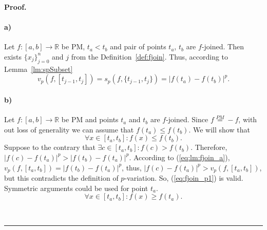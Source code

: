 \documentclass[12pt, a4paper]{article}
\newenvironment{proof}[1][Proof]{\noindent \textbf{#1.} }{\  \rule{0.5em}{0.5em}}
\numberwithin{equation}{section}
\begin{document}
\begin{proof}
  \paragraph*{a)}
  Let $f:[a,b] \rightarrow \mathbb{R}$  be PM, 
  $t_a<t_b$ and pair of points $t_a$, $t_b$ are $f$-joined. 
  Then exists $\{x_j\}_{j=0}^{n}$ and $j$ from the
  Definition~\ref{def:fjoin}.
  Thus, according to Lemma~\ref{lm:spSubset}
  \begin{equation}\label{eq:lm:fjoin_a}
    v_p(f,[t_{j-1}, t_j]) = 
      s_p\left(f,\{t_{j-1}, t_j\}\right) = \left|f(t_a)-f(t_b)\right|^p.
  \end{equation}      
  
  \paragraph*{b)}
  Let $f:[a,b] \rightarrow \mathbb{R}$ be PM 
  and points $t_a$ and $t_b$ are $f$-joined.
  Since $f \stackrel{PM}{=} -f$, with out loss of 
  generality we can assume that
  $f(t_a) \leq f(t_b)$.  
  We will show that 
  \begin{equation}\label{eq:fjoin_p1}
  \forall x \in [t_a,t_b]: f(x) \leq f(t_b).
  \end{equation}  
  Suppose to the contrary that 
  $\exists c \in [t_a, t_b]: f(c)>f(t_b)$. Therefore,
  $|f(c)-f(t_a)|^p>|f(t_b)-f(t_a)|^p$.
  According to (\ref{eq:lm:fjoin_a}), 
  $v_p(f,[t_a,t_b])=|f(t_b)-f(t_a)|^p$, 
  thus, $|f(c)-f(t_a)|^p>v_p(f,[t_a,t_b])$,
  but this contradicts the definition of $p$-variation.  
  So, (\ref{eq:fjoin_p1}) is valid.
  Symmetric arguments could be used for point $t_a$.  
  \begin{equation}
  \forall x \in [t_a,t_b]: f(x) \geq f(t_a).
  \end{equation}    
  
\end{proof}
\end{document}
